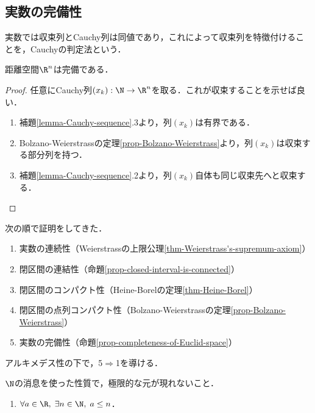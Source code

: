 \documentclass[uplatex,dvipdfmx]{jsreport}
\begin{document}
\subsection{実数の完備性}

\begin{tcolorbox}[colframe=ForestGreen, colback=ForestGreen!10!white, breakable ,colbacktitle=ForestGreen!40!white, coltitle=black,fonttitle=\bfseries\sffamily
    ,title=実数の特徴付け]
    実数では収束列とCauchy列は同値であり，これによって収束列を特徴付けることを，Cauchyの判定法という．
\end{tcolorbox}

\begin{proposition}\label{prop-completeness-of-Euclid-space}
    距離空間$\R^n$は完備である．
\end{proposition}
\begin{proof}
    任意にCauchy列$(x_k):\N\to\R^n$を取る．これが収束することを示せば良い．
    \begin{enumerate}
        \item 補題\ref{lemma-Cauchy-sequence}.3より，列$(x_k)$は有界である．
        \item Bolzano-Weierstrassの定理\ref{prop-Bolzano-Weierstrass}より，列$(x_k)$は収束する部分列を持つ．
        \item 補題\ref{lemma-Cauchy-sequence}.2より，列$(x_k)$自体も同じ収束先へと収束する．
    \end{enumerate}
\end{proof}

\begin{screen}
    次の順で証明をしてきた．
    \begin{enumerate}
        \item 実数の連続性（Weierstrassの上限公理\ref{thm-Weierstrass's-supremum-axiom}）
        \item 閉区間の連結性（命題\ref{prop-closed-interval-is-connected}）
        \item 閉区間のコンパクト性（Heine-Borelの定理\ref{thm-Heine-Borel}）
        \item 閉区間の点列コンパクト性（Bolzano-Weierstrassの定理\ref{prop-Bolzano-Weierstrass}）
        \item 実数の完備性（命題\ref{prop-completeness-of-Euclid-space}）
    \end{enumerate}
    アルキメデス性の下で，5$\Rightarrow$1を導ける．
\end{screen}

\begin{definition}
    $\N$の消息を使った性質で，極限的な元が現れないこと．
    \begin{enumerate}
        \item $\forall a\in\R,\;\exists n\in\N,\;a\le n$．
    \end{enumerate}
\end{definition}
\end{document}
